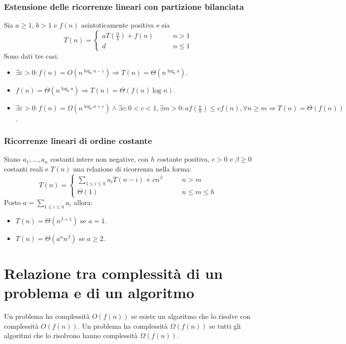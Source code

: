 \subsubsection{Estensione delle ricorrenze lineari con partizione bilanciata}
Sia $a\ge 1$, $b>1$ e $f(n)$ asintoticamente positiva e sia 
\begin{equation*}
T(n)=
\begin{cases}
aT(\frac{n}{b})+f(n)\quad\quad & n>1\\
d & n\le 1
\end{cases}
\end{equation*}
Sono dati tre casi.
\begin{itemize}
\item $\exists \varepsilon >0: f(n)=O(n^{\log_ba-\varepsilon})\Rightarrow T(n)=\Theta(n^{\log_ba})$.
\item $f(n)=\Theta(n^{\log_ba})\Rightarrow T(n)=\Theta(f(n)\log n)$.
\item $\exists\varepsilon>0:f(n)=\Omega(n^{\log_ba+\varepsilon})\land \exists c:0<c<1, \exists m>0:af(\frac{n}{b})\le cf(n),\forall n\ge m\Rightarrow T(n)=
\Theta(f(n))$.
\end{itemize}
\subsubsection{Ricorrenze lineari di ordine costante}
Siano $a_1,\dots,a_n$ costanti intere non negative, con $h$ costante positiva, $c>0$ e $\beta\ge 0$ costanti reali e $T(n)$ una relazione di ricorrenza 
nella forma:
\begin{equation*}
T(n)=
\begin{cases}
\sum\limits_{1\le i\le h}a_iT(n-i)+cn^\beta\quad\quad& n>m\\
\Theta(1) & n\le m\le h
\end{cases}
\end{equation*}
Posto $a=\sum\limits_{1\le i\le h}a_i$ allora:
\begin{itemize}
\item $T(n)=\Theta(n^{\beta+1})$ se $a=1$.
\item $T(n)=\Theta(a^nn^{\beta})$ se $a\ge 2$.
\end{itemize}




\section{Relazione tra complessit\`a di un problema e di un algoritmo}
Un problema ha complessit\`a $O(f(n))$ se esiste un algoritmo che lo risolve con complessit\`a $O(f(n))$. Un problema ha complessit\`a $\Omega(f(n))$ se
tutti gli algoritmi che lo risolvono hanno complessit\`a $\Omega(f(n))$.
